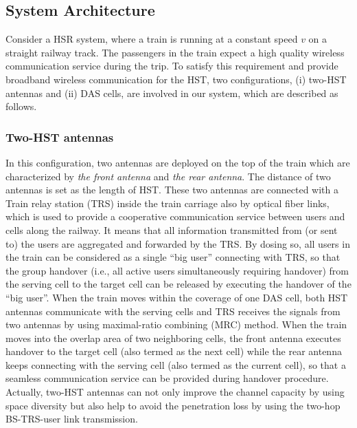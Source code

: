\documentclass[a4paper,twocolumn,10pt]{IEEEtran}
\begin{document}
\subsection{System Architecture}
Consider a HSR system, where a train is running at a constant speed $v$ on a straight railway track. The passengers in the train expect a high quality wireless communication service during the trip. To satisfy this requirement and provide broadband wireless communication for the HST, two configurations, (i) two-HST antennas and (ii) DAS cells, are involved in our system, which are described as follows.

\subsubsection{Two-HST antennas} In this configuration, two antennas are deployed on the top of the train which are characterized  by \textit{the front antenna} and \textit{the rear antenna}. The distance of two antennas is set as the length of HST. These two antennas are connected with a Train relay station (TRS) inside the train carriage also by optical fiber links, which is used to provide a cooperative communication service between users and cells along the railway. It means that all information transmitted from (or sent to) the users are aggregated and forwarded by the TRS. By dosing so, all users in the train can be considered as a single ``big user'' connecting with TRS, so that the group handover (i.e., all active users simultaneously requiring handover) from the serving cell to the target cell can be released by executing the handover of the ``big user''. When the train moves within the coverage of one DAS cell, both HST antennas communicate with the serving cells and TRS receives the signals from two antennas by using maximal-ratio combining (MRC) method. When the train moves into the overlap area of two neighboring cells, the front antenna executes handover to the target cell (also termed as the next cell) while the rear antenna keeps connecting with the serving cell (also termed as the current cell), so that a seamless communication service can be provided during handover procedure. Actually, two-HST antennas can not only improve the channel capacity by using space diversity but also help to avoid the penetration loss by using the two-hop BS-TRS-user link transmission.
\end{document}
